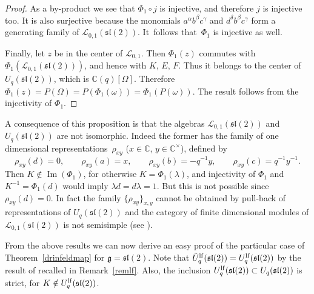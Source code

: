 \documentclass[pdftex]{sigma}%
\numberwithin{equation}{section}
\numberwithin{figure}{section}
\newcommand{\mc}{\mathbb{C}}
\newcommand{\Ll}{{\mathcal L}}
\begin{document}
\begin{proof}
As a by-product we see that $\Phi_1\circ j $ is injective, and therefore $j$ is injective too. It is also surjective because the monomials ${a}^\alpha {b}^\beta {c}^\gamma$ and ${d}^\delta {b}^\beta c^\gamma$ form a generating family of $\Ll_{0,1}({\mathfrak{sl}}(2))$. It~follows that~$\Phi_1$ is injective as well.

Finally, let $z$ be in the center of $\Ll_{0,1}$. Then $\Phi_1(z)$ commutes with $\Phi_1(\Ll_{0,1}({\mathfrak{sl}}(2)))$, and hence with $K$, $E$, $F$. Thus it belongs to the center of $U_q({\mathfrak{sl}}(2))$, which is $\mc(q)[\Omega]$. Therefore
$\Phi_1(z)=P(\Omega)=P(\Phi_1(\omega)) =\Phi_1(P(\omega)).$ The result follows from the injectivity of $\Phi_1$.\end{proof}

\begin{remk}A consequence of this proposition is that the algebras $\Ll_{0,1}({\mathfrak{sl}}(2))$ and $U_q({\mathfrak{sl}}(2))$ are not isomorphic. Indeed the former has the family of one dimensional representations~$\rho_{xy}$ ($x\in \mc$, $y\in \mc^\times$), defined by \[\rho_{xy}(d)=0,\qquad \rho_{xy}(a)=x, \qquad \rho_{xy}(b)=-q^{-1}y, \qquad \rho_{xy}(c)=q^{-1}y^{-1}.\]
Then $K\notin \operatorname{Im}(\Phi_1)$, for otherwise $K=\Phi_1(\lambda)$, and injectivity of $\Phi_1$ and $K^{-1}=\Phi_1(d)$ would imply $\lambda d=d\lambda=1$. But this is not possible since $\rho_{xy}(d)=0$. In fact the family $\{\rho_{xy}\}_{x,y}$ cannot be obtained by pull-back of representations of $U_q({\mathfrak{sl}}(2))$ and the category of finite dimensional modules of $\Ll_{0,1}({\mathfrak{sl}}(2))$ is not semisimple (see \cite[Proposition 9]{BRT}).
\end{remk}

From the above results we can now derive an easy proof of the particular case of Theorem~\ref{drinfeldmap} for $\mathfrak{g} = {\mathfrak{sl}}(2)$. Note that $\tilde U_q^{\rm lf}({\mathfrak{sl}}(2)) = U_q^{\rm lf}({\mathfrak{sl}}(2))$ by the result of \cite{JL} recalled in Remark~\ref{remlf}. Also, the inclusion $U_q^{\rm lf}({\mathfrak{sl}}(2))\subset U_q({\mathfrak{sl}}(2))$ is strict, for $K\notin U_q^{\rm lf}({\mathfrak{sl}}(2))$.
\end{document}

